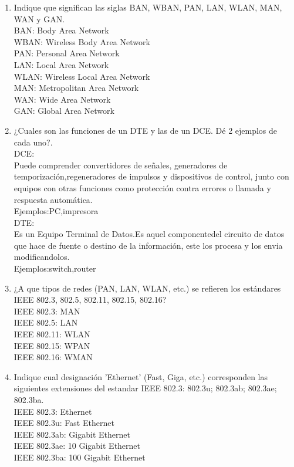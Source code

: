 \documentclass{udparticle}
\begin{document}
\begin{enumerate}
\item Indique que significan las siglas BAN, WBAN, PAN, LAN, WLAN, MAN, WAN y GAN.\\
    BAN: Body Area Network\\
    WBAN: Wireless Body Area Network\\
    PAN: Personal Area Network\\
    LAN: Local Area Network\\
    WLAN: Wireless Local Area Network\\
    MAN: Metropolitan Area Network\\
    WAN: Wide Area Network\\
    GAN: Global Area Network\\


\item ¿Cuales son las funciones de un DTE y las de un DCE. Dé 2 ejemplos de cada uno?.\\
    DCE:\\
        Puede comprender convertidores de señales, generadores de temporización,regeneradores de impulsos y dispositivos de control, 
        junto con equipos con otras funciones como protección contra errores o llamada y respuesta automática.\\
        Ejemplos:PC,impresora\\
    DTE:\\
        Es un Equipo Terminal de Datos.Es aquel componentedel circuito de datos que hace de fuente o destino de la información,
        este los procesa y los envia modificandolos.\\
        Ejemplos:switch,router\\
        
\item ¿A que tipos de redes (PAN, LAN, WLAN, etc.) se refieren los estándares IEEE 802.3, 802.5,
802.11, 802.15, 802.16?\\
    IEEE 802.3: MAN\\
    IEEE 802.5: LAN\\
    IEEE 802.11: WLAN\\
    IEEE 802.15: WPAN\\
    IEEE 802.16: WMAN\\

\item Indique cual designación 'Ethernet' (Fast, Giga, etc.) corresponden las siguientes extensiones
del estandar IEEE 802.3: 802.3u; 802.3ab; 802.3ae; 802.3ba.\\
    IEEE 802.3: Ethernet\\
    IEEE   802.3u: Fast Ethernet\\
    IEEE  802.3ab: Gigabit Ethernet\\
    IEEE 802.3ae: 10 Gigabit Ethernet\\
    IEEE 802.3ba: 100 Gigabit Ethernet\\
    

\end{enumerate}
\end{document}
